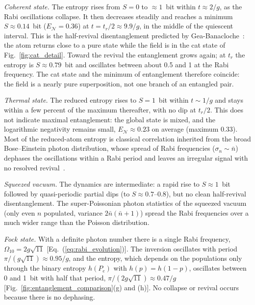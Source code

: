 \documentclass{iopjournal}
\begin{document}
\textit{Coherent state.} The entropy rises from $S = 0$ to $\approx 1$~bit within $t \approx 2/g$, as the Rabi oscillations collapse. It then decreases steadily and reaches a minimum $S \approx 0.14$~bit ($E_{\mathcal{N}} = 0.36$) at $t = t_r/2 \approx 9.9/g$, in the middle of the quiescent interval. This is the half-revival disentanglement predicted by Gea-Banacloche~\cite{gea-banacloche1990}: the atom returns close to a pure state while the field is in the cat state of Fig.~\ref{fig:cat_detail}. Toward the revival the entanglement grows again; at $t_r$ the entropy is $S \approx 0.79$~bit and oscillates between about 0.5 and 1 at the Rabi frequency. The cat state and the minimum of entanglement therefore coincide: the field is a nearly pure superposition, not one branch of an entangled pair.

\textit{Thermal state.} The reduced entropy rises to $S = 1$~bit within $t \sim 1/g$ and stays within a few percent of the maximum thereafter, with no dip at $t_r/2$. This does not indicate maximal entanglement: the global state is mixed, and the logarithmic negativity remains small, $E_{\mathcal{N}} \approx 0.23$ on average (maximum 0.33). Most of the reduced-atom entropy is classical correlation inherited from the broad Bose--Einstein photon distribution, whose spread of Rabi frequencies ($\sigma_n \sim \bar{n}$) dephases the oscillations within a Rabi period and leaves an irregular signal with no resolved revival~\cite{knight1982}.

\textit{Squeezed vacuum.} The dynamics are intermediate: a rapid rise to $S \approx 1$~bit followed by quasi-periodic partial dips (to $S \approx 0.7$--$0.8$), but no clean half-revival disentanglement. The super-Poissonian photon statistics of the squeezed vacuum (only even $n$ populated, variance $2\bar{n}(\bar{n}+1)$) spread the Rabi frequencies over a much wider range than the Poisson distribution.

\textit{Fock state.} With a definite photon number there is a single Rabi frequency, $\Omega_{10} = 2g\sqrt{11}$ [Eq.~(\ref{eq:rabi_evolution})]. The inversion oscillates with period $\pi/(g\sqrt{11}) \approx 0.95/g$, and the entropy, which depends on the populations only through the binary entropy $h(P_e)$ with $h(p) = h(1-p)$, oscillates between 0 and 1~bit with half that period, $\pi/(2g\sqrt{11}) \approx 0.47/g$ [Fig.~\ref{fig:entanglement_comparison}(g) and (h)]. No collapse or revival occurs because there is no dephasing.
\end{document}
